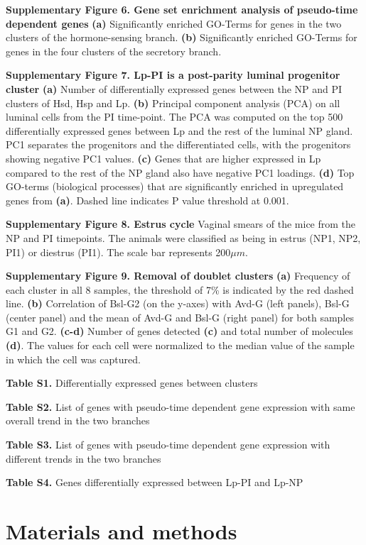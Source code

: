 \documentclass[titlepage, 12pt, oneside]{amsart}
\begin{document}
\textbf{Supplementary Figure 6. Gene set enrichment analysis of pseudo-time dependent genes}
\textbf{(a)} Significantly enriched GO-Terms for genes in the two clusters of the hormone-sensing branch.
\textbf{(b)} Significantly enriched GO-Terms for genes in the four clusters of the secretory branch.

\textbf{Supplementary Figure 7. Lp-PI is a post-parity luminal progenitor cluster}
\textbf{(a)} Number of differentially expressed genes between the NP and PI clusters of Hsd, Hsp and Lp.
\textbf{(b)} Principal component analysis (PCA) on all luminal cells from the PI time-point.
The PCA was computed on the top 500 differentially expressed genes between Lp and the rest of the luminal NP gland.
PC1 separates the progenitors and the differentiated cells, with the progenitors showing negative PC1 values.
\textbf{(c)} Genes that are higher expressed in Lp compared to the rest of the NP gland also have negative PC1 loadings.
\textbf{(d)} Top GO-terms (biological processes) that are significantly enriched in upregulated genes from \textbf{(a)}.
Dashed line indicates P value threshold at 0.001.

\textbf{Supplementary Figure 8. Estrus cycle}
Vaginal smears of the mice from the NP and PI timepoints. The animals were classified as being in estrus (NP1, NP2, PI1) or diestrus (PI1). The scale bar represents 200$\mu m$.

\textbf{Supplementary Figure 9. Removal of doublet clusters}
\textbf{(a)} Frequency of each cluster in all 8 samples, the threshold of 7\% is indicated by the red dashed line.
\textbf{(b)} Correlation of Bsl-G2 (on the y-axes) with Avd-G (left panels), Bsl-G (center panel) and the mean of Avd-G and Bsl-G (right panel) for both samples G1 and G2.
\textbf{(c-d)} Number of genes detected \textbf{(c)} and total number of molecules \textbf{(d)}. The values for each cell were normalized to the median value of the sample in which the cell was captured.

\textbf{Table S1.} Differentially expressed genes between clusters

\textbf{Table S2.} List of genes with pseudo-time dependent gene
expression with same overall trend in the two branches

\textbf{Table S3.} List of genes with pseudo-time dependent gene
expression with different trends in the two branches

\textbf{Table S4.} Genes differentially expressed between Lp-PI and Lp-NP

\section{Materials and methods}
\end{document}
